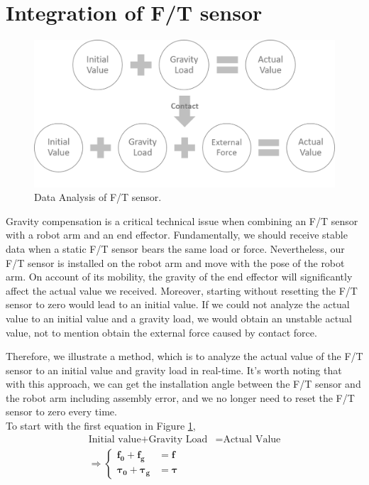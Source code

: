 \section{Integration of F/T sensor}
\label{sec:grav compen}
\begin{figure}[htbp]
\begin{center}
\includegraphics[width=1\linewidth]{Images/gravity compensation.png}
\end{center}
\caption{
Data Analysis of F/T sensor.
}\label{fig:gravity compensation}
\end{figure}
Gravity compensation is a critical technical issue when combining an F/T sensor with a robot arm and an end effector. Fundamentally, we should receive stable data when a static F/T sensor bears the same load or force. Nevertheless, our F/T sensor is installed on the robot arm and move with the pose of the robot arm. On account of its mobility, the gravity of the end effector will significantly affect the actual value we received. Moreover, starting without resetting the F/T sensor to zero would lead to an initial value. If we could not analyze the actual value to an initial value and a gravity load, we would obtain an unstable actual value, not to mention obtain the external force caused by contact force.

Therefore, we illustrate a method, which is to analyze the actual value of the F/T sensor to an initial value and gravity load in real-time. It's worth noting that with this approach, we can get the installation angle between the F/T sensor and the robot arm including assembly error, and we no longer need to reset the F/T sensor to zero every time. \\
To start with the first equation in Figure \ref{fig:gravity compensation},
\begin{equation}\label{eq:gc_iga}
\begin{split}
\text{Initial value}	+ \text{Gravity Load} 		&= \text{Actual Value} \\
\Rightarrow \left\{\begin{matrix}
\boldsymbol{f_0}		+\boldsymbol{f_g}			&= \boldsymbol{f}\\ 
\boldsymbol{\tau_0}	+\boldsymbol{\tau_g}		&= \boldsymbol{\tau}	
\end{matrix}\right.	\\
\end{split}
\end{equation}

